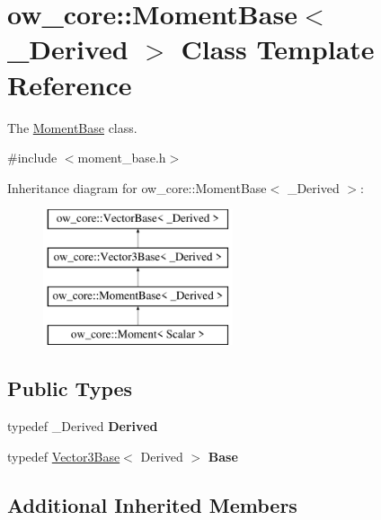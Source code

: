 \hypertarget{classow__core_1_1MomentBase}{}\section{ow\+\_\+core\+:\+:Moment\+Base$<$ \+\_\+\+Derived $>$ Class Template Reference}
\label{classow__core_1_1MomentBase}


The \hyperlink{classow__core_1_1MomentBase}{Moment\+Base} class.  




{\ttfamily \#include $<$moment\+\_\+base.\+h$>$}

Inheritance diagram for ow\+\_\+core\+:\+:Moment\+Base$<$ \+\_\+\+Derived $>$\+:\begin{figure}[H]
\begin{center}
\leavevmode
\includegraphics[height=4.000000cm]{db/d0e/classow__core_1_1MomentBase}
\end{center}
\end{figure}
\subsection*{Public Types}
\begin{DoxyCompactItemize}
\item 
typedef \+\_\+\+Derived {\bfseries Derived}\hypertarget{classow__core_1_1MomentBase_ac14cb697bdb3a113bc18ad3e660db470}{}\label{classow__core_1_1MomentBase_ac14cb697bdb3a113bc18ad3e660db470}

\item 
typedef \hyperlink{classow__core_1_1Vector3Base}{Vector3\+Base}$<$ Derived $>$ {\bfseries Base}\hypertarget{classow__core_1_1MomentBase_add8e488bb5a37dee1def90c71390139a}{}\label{classow__core_1_1MomentBase_add8e488bb5a37dee1def90c71390139a}

\end{DoxyCompactItemize}
\subsection*{Additional Inherited Members}


